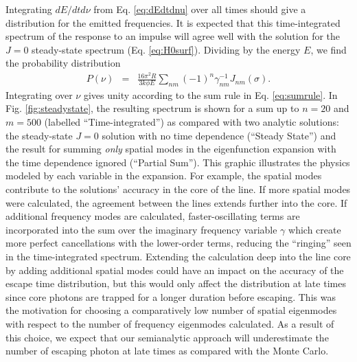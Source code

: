 \documentclass{aastex63}
\newcommand{\be}{\begin{eqnarray}}
\newcommand{\ee}{\end{eqnarray}}
\begin{document}
Integrating $dE/dt d\nu$ from Eq. \ref{eq:dEdtdnu} over all times should give a distribution for the emitted frequencies. It is expected that this time-integrated spectrum of the response to an impulse will agree well with the solution for the $J=0$ steady-state spectrum (Eq. \ref{eq:H0surf}). Dividing by the energy $E$, we find the probability distribution
\be \label{eq:spectrum}
P(\nu) & = &  \frac{16\pi^2 R}{3k\phi E}  \sum_{nm} (-1)^n \gamma_{nm}^{-1} J_{nm}(\sigma).
\ee
Integrating over $\nu$ gives unity according to the sum rule in Eq. \ref{eq:sumrule}. In Fig. \ref{fig:steadystate}, the resulting spectrum is shown for a sum up to $n=20$ and $m=500$ (labelled ``Time-integrated'') as compared with two analytic solutions: the steady-state $J=0$ solution with no time dependence (``Steady State'') and the result for summing \textit{only} spatial modes in the eigenfunction expansion with the time dependence ignored (``Partial Sum''). This graphic illustrates the physics modeled by each variable in the expansion. For example, the spatial modes contribute to the solutions' accuracy in the core of the line. If more spatial modes were calculated, the agreement between the lines extends further into the core. If additional frequency modes are calculated, faster-oscillating terms are incorporated into the sum over the imaginary frequency variable $\gamma$ which create more perfect cancellations with the lower-order terms, reducing the ``ringing'' seen in the time-integrated spectrum. Extending the calculation deep into the line core by adding additional spatial modes could have an impact on the accuracy of the escape time distribution, but this would only affect the distribution at late times since core photons are trapped for a longer duration before escaping. This was the motivation for choosing a comparatively low number of spatial eigenmodes with respect to the number of frequency eigenmodes calculated. As a result of this choice, we expect that our semianalytic approach will underestimate the number of escaping photon at late times as compared with the Monte Carlo.
\end{document}
